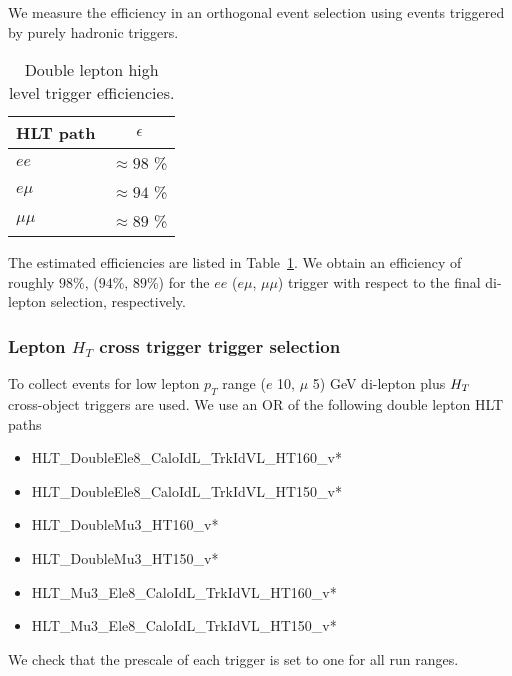We measure the efficiency in an orthogonal event selection
using events triggered by purely hadronic triggers.


\begin{table}[hbtp]
\caption{Double lepton high level trigger efficiencies. \label{tab:Trigger}}
\begin{center}
\begin{tabular}{|l||c|} \hline
HLT path  & $\epsilon$\\\hline \hline
$ee $  & $\approx 98$ \%\\ \hline
$e\mu $  & $\approx 94$ \%\\ \hline
$\mu\mu $  & $\approx 89$ \%\\ \hline
\end{tabular}
\end{center}
\end{table}

The estimated efficiencies are listed in Table~\ref{tab:Trigger}. 
We obtain an efficiency of roughly $98$\%, ($94$\%, $89$\%) 
for the $ee$ ($e\mu$, $\mu\mu$) trigger with respect to the final 
di-lepton selection, respectively.

\subsubsection{Lepton $H_T$ cross trigger trigger selection}
To collect events for low lepton $p_T$ range ($e$ 10, $\mu$ 5) GeV di-lepton plus
$H_T~$ cross-object triggers are used.
We use an OR of the following double lepton \HT HLT paths
\begin{itemize}
\item HLT\_DoubleEle8\_CaloIdL\_TrkIdVL\_HT160\_v* 
\item HLT\_DoubleEle8\_CaloIdL\_TrkIdVL\_HT150\_v* 
\item HLT\_DoubleMu3\_HT160\_v* 
\item HLT\_DoubleMu3\_HT150\_v* 
\item HLT\_Mu3\_Ele8\_CaloIdL\_TrkIdVL\_HT160\_v* 
\item HLT\_Mu3\_Ele8\_CaloIdL\_TrkIdVL\_HT150\_v*
\end{itemize}
We check that the prescale of each trigger is set to one
for all run ranges.

